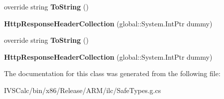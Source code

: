\begin{DoxyCompactItemize}
override string {\bfseries To\+String} ()
\item 
\mbox{\label{class_windows_1_1_web_1_1_http_1_1_headers_1_1_http_response_header_collection_afbaffb1a2a7b767bd664ea7804cdc8aa}} 
{\bfseries Http\+Response\+Header\+Collection} (global\+::\+System.\+Int\+Ptr dummy)
\item 
\mbox{\label{class_windows_1_1_web_1_1_http_1_1_headers_1_1_http_response_header_collection_a8eea7ad61287f28aae000337247e42d6}} 
override string {\bfseries To\+String} ()
\item 
\mbox{\label{class_windows_1_1_web_1_1_http_1_1_headers_1_1_http_response_header_collection_afbaffb1a2a7b767bd664ea7804cdc8aa}} 
{\bfseries Http\+Response\+Header\+Collection} (global\+::\+System.\+Int\+Ptr dummy)
\end{DoxyCompactItemize}


The documentation for this class was generated from the following file\+:\begin{DoxyCompactItemize}
\item 
I\+V\+S\+Calc/bin/x86/\+Release/\+A\+R\+M/ilc/Safe\+Types.\+g.\+cs\end{DoxyCompactItemize}
